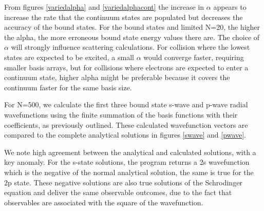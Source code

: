 \documentclass{article}
\begin{document}
	From figures \ref{variedalpha} and \ref{variedalphacont} the increase in $\alpha$ appears to increase the rate that the continuum states are populated but decreases the accuracy of the bound states. For the bound states and limited N=20, the higher the alpha, the more erroneous bound state energy values there are. The choice of $\alpha$ will strongly influence scattering calculations. For collision where the lowest states are expected to be excited, a small $\alpha$ would converge faster, requiring smaller basis arrays, but for collisions where electrons are expected to enter a continuum state, higher alpha might be preferable because it covers the continuum faster for the same basis size. 
	
	For N=500, we calculate the first three bound state s-wave and p-wave radial wavefunctions using the finite summation of the basis functions with their coefficients, as previously outlined. These calculated wavefunction vectors are compared to the complete analytical solutions in figures \ref{swave} and \ref{pwave}. 
	
	We note high agreement between the analytical and calculated solutions, with a key anomaly. For the s-state solutions, the program returns a 2s wavefunction which is the negative of the normal analytical solution, the same is true for the 2p state. These negative solutions are also true solutions of the Schrodinger equation and deliver the same observable outcomes, due to the fact that observables are associated with the square of the wavefunction. 
	
\end{document}
